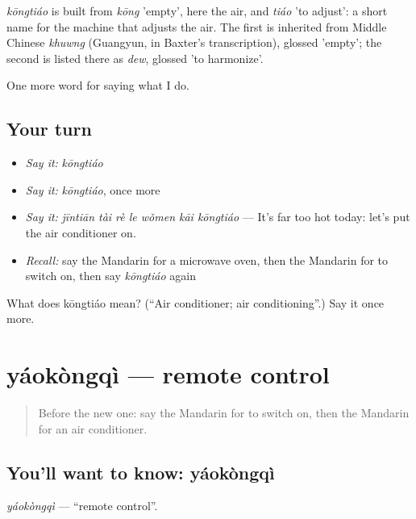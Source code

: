 \begin{cousinweb}
\emph{kōngtiáo} is built from \emph{kōng} 'empty', here the air, and \emph{tiáo} 'to adjust': a short name for the machine that adjusts the air. The first is inherited from Middle Chinese \emph{khuwng} (Guangyun, in Baxter's transcription), glossed 'empty'; the second is listed there as \emph{dew}, glossed 'to harmonize'.
\end{cousinweb}

\begin{grammarlens}[title={What you've built}]
One more word for saying what I do.
\end{grammarlens}

\subsection*{Your turn}
\begin{itemize}
\raggedright
  \item \emph{Say it:} \emph{kōngtiáo}
  \item \emph{Say it:} \emph{kōngtiáo}, once more
  \item \emph{Say it:} \emph{jīntiān tài rè le wǒmen kāi kōngtiáo} — It's far too hot today: let's put the air conditioner on.
  \item \emph{Recall:} say the Mandarin for a microwave oven, then the Mandarin for to switch on, then say \emph{kōngtiáo} again
\end{itemize}

\begin{tcolorbox}[breakable,colback=teal!4,colframe=teal!35!black,title={Before you move on}]
What does kōngtiáo mean? (\textquotedblleft{}Air conditioner; air conditioning\textquotedblright{}.) Say it once more.
\end{tcolorbox}
\section[yáokòngqì]{yáokòngqì — remote control}

\label{lesson:ZH-C171-yaokongqi}



\begin{quote}
Before the new one: say the Mandarin for to switch on, then the Mandarin for an air conditioner.
\end{quote}

\subsection*{You'll want to know: yáokòngqì}
\emph{yáokòngqì} — \textquotedblleft{}remote control\textquotedblright{}.


